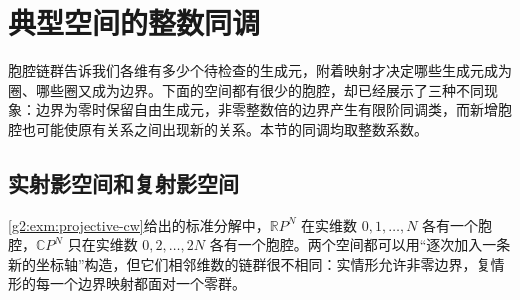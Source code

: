 
% 
% 

\section{典型空间的整数同调}
\label{g2:sec:0303}

胞腔链群告诉我们各维有多少个待检查的生成元，附着映射才决定哪些生成元成为圈、哪些圈又成为边界。下面的空间都有很少的胞腔，却已经展示了三种不同现象：边界为零时保留自由生成元，非零整数倍的边界产生有限阶同调类，而新增胞腔也可能使原有关系之间出现新的关系。本节的同调均取整数系数。

\subsection{实射影空间和复射影空间}
\label{g2:subsec:0303:01}

\cref{g2:exm:projective-cw}给出的标准分解中，\(\mathbb RP^N\) 在实维数 \(0,1,\ldots,N\) 各有一个胞腔，\(\mathbb CP^N\) 只在实维数 \(0,2,\ldots,2N\) 各有一个胞腔。两个空间都可以用“逐次加入一条新的坐标轴”构造，但它们相邻维数的链群很不相同：实情形允许非零边界，复情形的每一个边界映射都面对一个零群。

